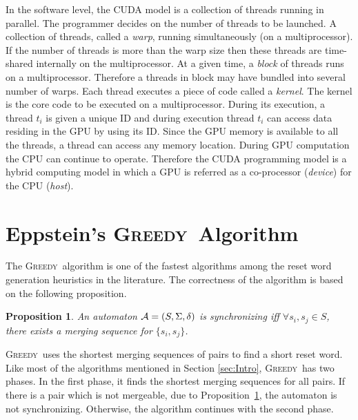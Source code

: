 \documentclass[12pt]{article}
\newtheorem{proposition}{Proposition}[section]
\newcommand{\greedyAlgo}{\textsc{Greedy}}
\begin{document}
In the software level, the CUDA model is a collection of threads
running in parallel.  The programmer decides on the number of threads
to be launched.  A collection of threads, called a \textit{warp},
running simultaneously (on a multiprocessor).  If the number of
threads is more than the warp size then these threads are time-shared
internally on the multiprocessor.  At a given time, a \textit{block}
of threads runs on a multiprocessor.  Therefore a threads in block may
have bundled into several number of warps.  Each thread executes a
piece of code called a \textit{kernel}.  The kernel is the core code
to be executed on a multiprocessor.  During its execution, a thread
$t_i$ is given a unique ID and during execution thread $t_i$ can
access data residing in the GPU by using its ID.  Since the GPU memory
is available to all the threads, a thread can access any memory
location.  During GPU computation the CPU can continue to operate.
Therefore the CUDA programming model is a hybrid computing model in
which a GPU is referred as a co-processor (\textit{device}) for the
CPU (\textit{host}).





\clearpage
\section{Eppstein's \greedyAlgo\ Algorithm}
\label{sec:greedy}

The \greedyAlgo\ algorithm is one of the fastest algorithms among the reset word generation heuristics in the literature. The correctness of the algorithm is based on the following proposition.

\begin{proposition}
	\label{prop:synchronizable}
	An automaton ${\cal A}=(S,\Sigma,\delta)$ is synchronizing iff $\forall s_i,s_j \in S$, there exists a merging sequence for $\{ s_i, s_j \}$.
\end{proposition}

\noindent \greedyAlgo\  uses the shortest merging sequences of pairs to find a short reset word. Like most of the algorithms mentioned in Section \ref{sec:Intro}, \greedyAlgo\ has two  phases. In the first phase, it finds the shortest merging sequences for all pairs. If there is a pair which is not mergeable, due to Proposition~\ref{prop:synchronizable}, the automaton is not synchronizing. Otherwise, the algorithm continues with the second phase.
\end{document}
